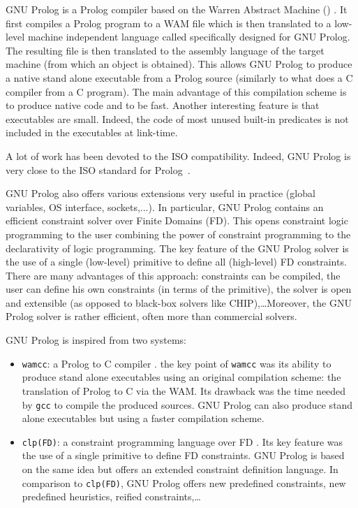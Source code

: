  GNU Prolog is a Prolog compiler
based on the Warren Abstract Machine () \cite{Warren83,Ait-Kaci91}.
It first compiles a Prolog program to a WAM file which is then translated to
a low-level machine independent language called 
specifically designed for GNU Prolog. The resulting file is then translated
to the assembly language of the target machine (from which an object is
obtained). This allows GNU Prolog to produce a native stand alone executable
from a Prolog source (similarly to what does a C compiler from a C program).
The main advantage of this compilation scheme is to produce native code and
to be fast. Another interesting feature is that executables are small.
Indeed, the code of most unused built-in predicates is not included in the
executables at link-time.

A lot of work has been devoted to the ISO compatibility. Indeed, GNU Prolog
is very close to the ISO standard for Prolog~\cite{iso-part1}.

GNU Prolog also offers various extensions very useful in practice (global
variables, OS interface, sockets,...). In particular, GNU Prolog contains an
efficient constraint solver over Finite Domains (FD). This opens constraint
logic programming to the user combining the power of constraint programming to
the declarativity of logic programming. The key feature of the GNU Prolog
solver is the use of a single (low-level) primitive to define all
(high-level) FD constraints. There are many advantages of this approach:
constraints can be compiled, the user can define his own constraints (in
terms of the primitive), the solver is open and extensible (as opposed to
black-box solvers like CHIP),\ldots Moreover, the GNU Prolog solver is rather
efficient, often more than commercial solvers.

GNU Prolog is inspired from two systems:

\begin{itemize}

\item \texttt{wamcc}: a Prolog to C compiler \cite{wamcc}. the key point of \texttt{wamcc} was its
ability to produce stand alone executables using an original compilation
scheme: the translation of Prolog to C via the WAM. Its drawback was the time
needed by \texttt{gcc} to compile the produced sources. GNU Prolog can also
produce stand alone executables but using a faster compilation scheme.

\item \texttt{clp(FD)}: a constraint programming language over FD
\cite{long-clp-fd}. Its key feature was the use of a
single primitive to define FD constraints. GNU Prolog is based on the same
idea but offers an extended constraint definition language. In comparison to
\texttt{clp(FD)}, GNU Prolog offers new predefined constraints, new
predefined heuristics, reified constraints,\ldots

\end{itemize}

